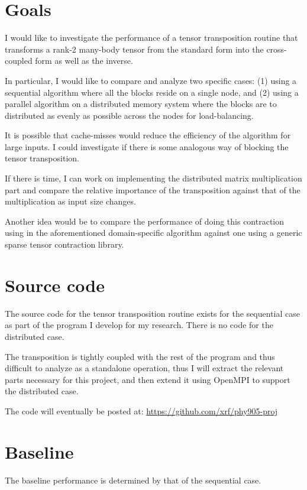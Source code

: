 \documentclass[fleqn, 12pt]{article}
\begin{document}
\section{Goals}

I would like to investigate the performance of a tensor transposition routine that transforms a rank-2 many-body tensor from the standard form into the cross-coupled form as well as the inverse.

In particular, I would like to compare and analyze two specific cases: (1) using a sequential algorithm where all the blocks reside on a single node, and (2) using a parallel algorithm on a distributed memory system where the blocks are to distributed as evenly as possible across the nodes for load-balancing.

It is possible that cache-misses would reduce the efficiency of the algorithm for large inputs.  I could investigate if there is some analogous way of blocking the tensor transposition.

If there is time, I can work on implementing the distributed matrix multiplication part and compare the relative importance of the transposition against that of the multiplication as input size changes.

Another idea would be to compare the performance of doing this contraction using in the aforementioned domain-specific algorithm against one using a generic sparse tensor contraction library.

\section{Source code}

The source code for the tensor transposition routine exists for the sequential case as part of the program I develop for my research.  There is no code for the distributed case.

The transposition is tightly coupled with the rest of the program and thus difficult to analyze as a standalone operation, thus I will extract the relevant parts necessary for this project, and then extend it using OpenMPI to support the distributed case.

The code will eventually be posted at: \url{https://github.com/xrf/phy905-proj}

\section{Baseline}

The baseline performance is determined by that of the sequential case.
\end{document}
